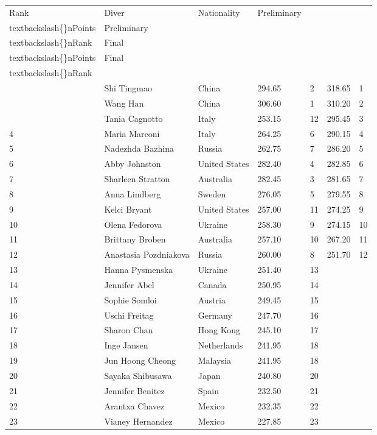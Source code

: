 \documentclass{article}
\begin{document}
\begin{tabular}{lllllll}
\toprule
Rank & Diver & Nationality & Preliminary\\textbackslash\{\}nPoints & Preliminary\\textbackslash\{\}nRank & Final\\textbackslash\{\}nPoints & Final\\textbackslash\{\}nRank \\
\midrule
 & Shi Tingmao & China & 294.65 & 2 & 318.65 & 1 \\
 & Wang Han & China & 306.60 & 1 & 310.20 & 2 \\
 & Tania Cagnotto & Italy & 253.15 & 12 & 295.45 & 3 \\
4 & Maria Marconi & Italy & 264.25 & 6 & 290.15 & 4 \\
5 & Nadezhda Bazhina & Russia & 262.75 & 7 & 286.20 & 5 \\
6 & Abby Johnston & United States & 282.40 & 4 & 282.85 & 6 \\
7 & Sharleen Stratton & Australia & 282.45 & 3 & 281.65 & 7 \\
8 & Anna Lindberg & Sweden & 276.05 & 5 & 279.55 & 8 \\
9 & Kelci Bryant & United States & 257.00 & 11 & 274.25 & 9 \\
10 & Olena Fedorova & Ukraine & 258.30 & 9 & 274.15 & 10 \\
11 & Brittany Broben & Australia & 257.10 & 10 & 267.20 & 11 \\
12 & Anastasia Pozdniakova & Russia & 260.00 & 8 & 251.70 & 12 \\
13 & Hanna Pysmenska & Ukraine & 251.40 & 13 &  &  \\
14 & Jennifer Abel & Canada & 250.95 & 14 &  &  \\
15 & Sophie Somloi & Austria & 249.45 & 15 &  &  \\
16 & Uschi Freitag & Germany & 247.70 & 16 &  &  \\
17 & Sharon Chan & Hong Kong & 245.10 & 17 &  &  \\
18 & Inge Jansen & Netherlands & 241.95 & 18 &  &  \\
19 & Jun Hoong Cheong & Malaysia & 241.95 & 18 &  &  \\
20 & Sayaka Shibusawa & Japan & 240.80 & 20 &  &  \\
21 & Jennifer Benitez & Spain & 232.50 & 21 &  &  \\
22 & Arantxa Chavez & Mexico & 232.35 & 22 &  &  \\
23 & Vianey Hernandez & Mexico & 227.85 & 23 &  &  \\

\end{tabular}
\end{document}

